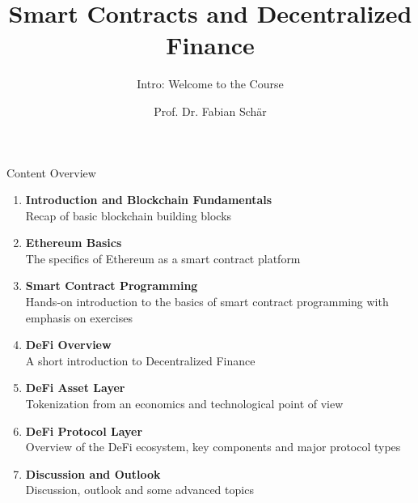 \documentclass[handout]{beamer}
\title{Smart Contracts and Decentralized Finance}
\subtitle{Intro: Welcome to the Course}
\author{Prof. Dr. Fabian Schär}
\institute{University of Basel}
\begin{document}
\thispagestyle{empty}
\begin{frame}[noframenumbering]
	\titlepage
\end{frame}

\begin{frame}{Content Overview}
\small
\begin{enumerate}
	\item<1-> \textbf{Introduction and Blockchain Fundamentals}\\
		Recap of basic blockchain building blocks
		\vspace{0.2em}
	\item<2-> \textbf{Ethereum Basics}\\
		The specifics of Ethereum as a smart contract platform
		\vspace{0.2em}
	\item<3-> \textbf{Smart Contract Programming}\\
		Hands-on introduction to the basics of smart contract programming with emphasis on exercises
	\item<4-> \textbf{DeFi Overview}\\
		A short introduction to Decentralized Finance
		\vspace{0.2em}
	\item<5-> \textbf{DeFi Asset Layer}\\
		Tokenization from an economics and technological point of view
		\vspace{0.2em}
	\item<6-> \textbf{DeFi Protocol Layer}\\
			Overview of the DeFi ecosystem, key components and major protocol types
	\item<7-> \textbf{Discussion and Outlook}\\
			Discussion, outlook and some advanced topics
\end{enumerate}

\end{frame}

\iffalse
\end{document}
